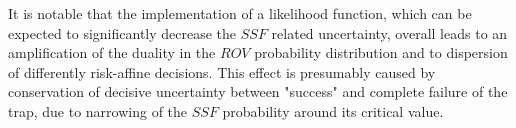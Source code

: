 		It is notable that the implementation of a likelihood function, which can be expected to significantly decrease the $SSF$ related uncertainty, overall leads to an amplification of the duality in the $ROV$ probability distribution and to dispersion of differently risk-affine decisions. This effect is presumably caused by conservation of decisive uncertainty between "success" and complete failure of the trap, due to narrowing of the $SSF$ probability around its critical value. 